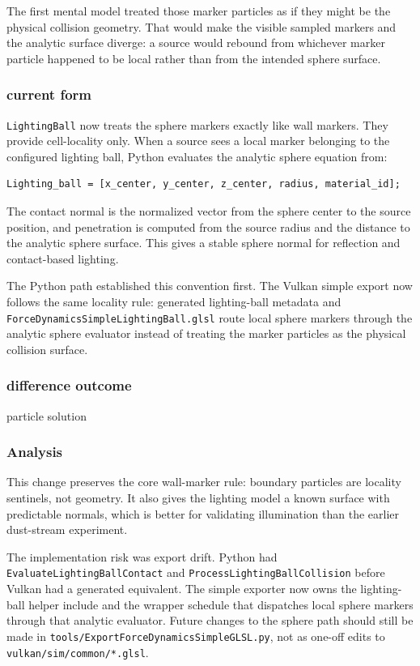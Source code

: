 The first mental model treated those marker particles as if they might be the
physical collision geometry.  That would make the visible sampled markers and
the analytic surface diverge: a source would rebound from whichever marker
particle happened to be local rather than from the intended sphere surface.

\subsubsection{current form}

\texttt{LightingBall} now treats the sphere markers exactly like wall
markers.  They provide cell-locality only.  When a source sees a local marker
belonging to the configured lighting ball, Python evaluates the analytic
sphere equation from:
\begin{verbatim}
Lighting_ball = [x_center, y_center, z_center, radius, material_id];
\end{verbatim}
The contact normal is the normalized vector from the sphere center to the
source position, and penetration is computed from the source radius and the
distance to the analytic sphere surface.  This gives a stable sphere normal
for reflection and contact-based lighting.

The Python path established this convention first.  The Vulkan simple export
now follows the same locality rule: generated lighting-ball metadata and
\texttt{ForceDynamicsSimpleLightingBall.glsl} route local sphere markers
through the analytic sphere evaluator instead of treating the marker particles
as the physical collision surface.

\subsubsection{difference outcome}

particle solution

\subsubsection{Analysis}

This change preserves the core wall-marker rule: boundary particles are
locality sentinels, not geometry.  It also gives the lighting model a known
surface with predictable normals, which is better for validating illumination
than the earlier dust-stream experiment.

The implementation risk was export drift.  Python had
\texttt{EvaluateLightingBallContact} and
\texttt{ProcessLightingBallCollision} before Vulkan had a generated
equivalent.  The simple exporter now owns the lighting-ball helper include and
the wrapper schedule that dispatches local sphere markers through that
analytic evaluator.  Future changes to the sphere path should still be made in
\texttt{tools/ExportForceDynamicsSimpleGLSL.py}, not as one-off edits to
\texttt{vulkan/sim/common/*.glsl}.

